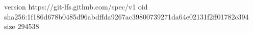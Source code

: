 version https://git-lfs.github.com/spec/v1
oid sha256:1f186d678b0485d96abdffda9267ac39800739271da64e02131f2ff01782c394
size 294538
